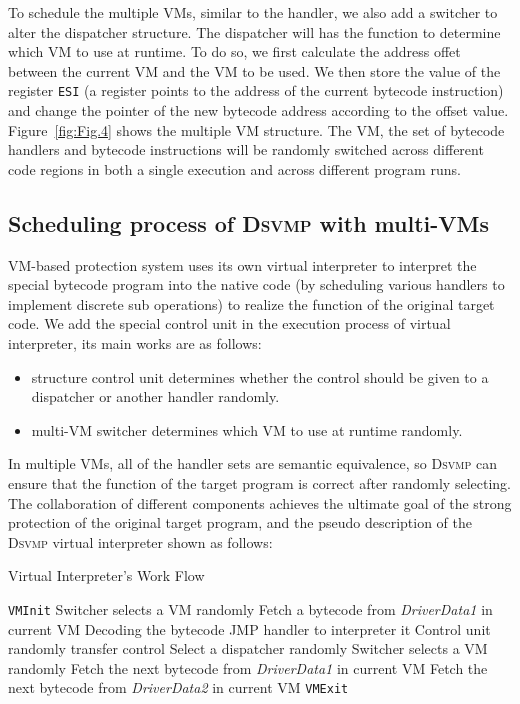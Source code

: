 \documentclass[preprint,12pt,3p]{elsarticle}
\newcommand{\DSVMP}{\textsc{Dsvmp }}
\newcommand\FIXME[1]{\textcolor{red}{FIX:}\textcolor{red}{#1}}
\begin{document}
To schedule the multiple VMs, similar to the handler, we also add a switcher to alter the dispatcher structure.
The dispatcher will has the function to determine which VM to use at runtime.
To do so, we first calculate the address offet between the current VM and the VM to be used.
We then store the value of the register \texttt{ESI} (a register points to the address of the current bytecode instruction)
and change the pointer of the new bytecode address according to the offset value.
Figure~\ref{fig:Fig.4} shows the multiple VM structure.
The VM, the set of bytecode handlers and bytecode instructions will be randomly switched
across different code regions in both a single execution and across different program runs.

\subsection{Scheduling process of \DSVMP with multi-VMs}
VM-based protection system uses its own virtual interpreter to interpret the special bytecode program into the native code
(by scheduling various handlers to implement discrete sub operations) to realize the function of the original target code.
We add the special control unit in the execution process of virtual interpreter, its main works are as follows:
\begin{itemize}
  \item structure control unit determines whether the control should be given to a dispatcher or another handler randomly.
  \item multi-VM switcher determines which VM to use at runtime randomly.
\end{itemize}

In multiple VMs, all of the handler sets are semantic equivalence,
so \DSVMP can ensure that the function of the target program is correct after randomly selecting.
The collaboration of different components achieves the ultimate goal of the strong protection of the original target program,
and the pseudo description of the \DSVMP virtual interpreter shown as follows:

\begin{algorithm}
\caption{Virtual Interpreter's Work Flow\label{Alg:VMcore-work}}
\begin{algorithmic}[1]
\STATE \texttt{VMInit}
\STATE Switcher selects a VM randomly
\STATE Fetch a bytecode from \emph{DriverData1} in current VM
\STATE Decoding the bytecode
\STATE JMP handler to interpreter it
\STATE Control unit randomly transfer control
\STATE Select a dispatcher randomly
\STATE Switcher selects a VM randomly
\STATE Fetch the next bytecode from \emph{DriverData1} in current VM
\STATE Fetch the next bytecode from \emph{DriverData2} in current VM
\ENDIF
\ENDWHILE
\STATE \texttt{VMExit}
\end{algorithmic}
\end{algorithm}
\end{document}
